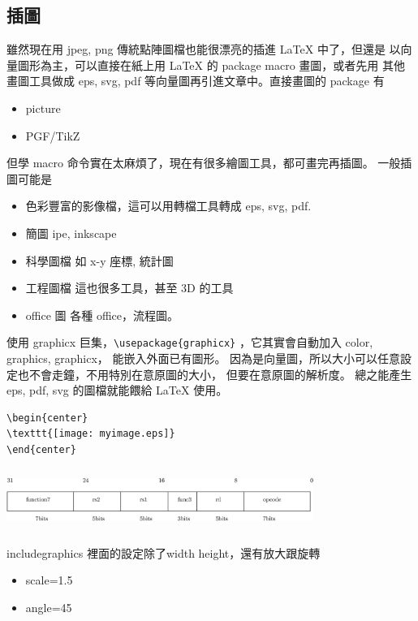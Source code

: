 \subsection{插圖}
雖然現在用 jpeg, png 傳統點陣圖檔也能很漂亮的插進 {\LaTeX} 中了，但還是
以向量圖形為主，可以直接在紙上用 {\LaTeX} 的 package macro 畫圖，或者先用
其他畫圖工具做成 eps, svg, pdf 等向量圖再引進文章中。直接畫圖的 package
有
\begin{itemize}
\item picture
\item PGF/TikZ
\end{itemize}
但學 macro 命令實在太麻煩了，現在有很多繪圖工具，都可畫完再插圖。
一般插圖可能是
\begin{itemize}
\item 色彩豐富的影像檔，這可以用轉檔工具轉成 eps, svg, pdf.
\item 簡圖 ipe, inkscape
\item 科學圖檔 如 x-y 座標, 統計圖
\item 工程圖檔 這也很多工具，甚至 3D 的工具
\item office 圖 各種 office，流程圖。
\end{itemize}
使用 graphicx 巨集，\verb=\usepackage{graphicx}= ，它其實會自動加入
color, graphics, graphicx， 能嵌入外面已有圖形。
因為是向量圖，所以大小可以任意設定也不會走鐘，不用特別在意原圖的大小，
但要在意原圖的解析度。
總之能產生 eps, pdf, svg 的圖檔就能餵給 {\LaTeX} 使用。
\begin{verbatim}
\begin{center}
\texttt{[image: myimage.eps]}
\end{center}
\end{verbatim}
\begin{center}
\includegraphics[width=10cm,height=2cm]{images/riscv.eps}
\end{center}
includegraphics 裡面的設定除了width height，還有放大跟旋轉
\begin{itemize}
\item scale=1.5
\item angle=45
\end{itemize}

